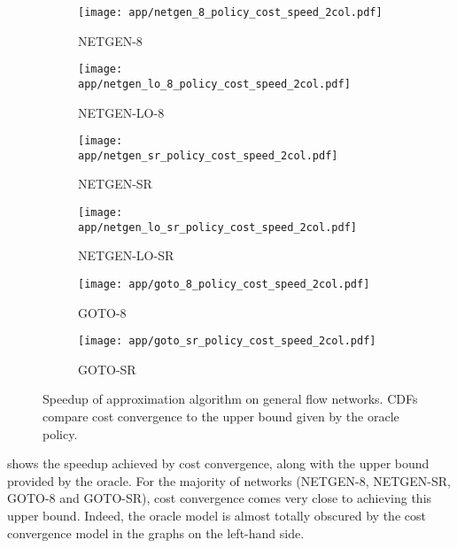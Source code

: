 \begin{figure}
    \begin{widepage}
        \begin{subfigure}[c]{0.5\textwidth}
            \texttt{[image: app/netgen\_8\_policy\_cost\_speed\_2col.pdf]}
            \caption{NETGEN-8}
        \end{subfigure}
        \begin{subfigure}[c]{0.5\textwidth}
            \texttt{[image: app/netgen\_lo\_8\_policy\_cost\_speed\_2col.pdf]}
            \caption{NETGEN-LO-8}
        \end{subfigure}
        \begin{subfigure}[c]{0.5\textwidth}
            \texttt{[image: app/netgen\_sr\_policy\_cost\_speed\_2col.pdf]}
            \caption{NETGEN-SR}
        \end{subfigure}
        \begin{subfigure}[c]{0.5\textwidth}
            \texttt{[image: app/netgen\_lo\_sr\_policy\_cost\_speed\_2col.pdf]}
            \caption{NETGEN-LO-SR}
        \end{subfigure}
        \begin{subfigure}[c]{0.5\textwidth}
            \texttt{[image: app/goto\_8\_policy\_cost\_speed\_2col.pdf]}
            \caption{GOTO-8}
        \end{subfigure}
        \begin{subfigure}[c]{0.5\textwidth}
            \texttt{[image: app/goto\_sr\_policy\_cost\_speed\_2col.pdf]}
            \caption{GOTO-SR}
        \end{subfigure}
    \end{widepage}
    \caption[Speedup of approximation algorithm on general flow networks]{Speedup of approximation algorithm on general flow networks. CDFs compare {\color{matplotlib_blue}cost convergence} to the upper bound given by the {\color{matplotlib_green}oracle policy}.}
    \label{fig:app-general-cost-speed-cdf}
\end{figure}

 shows the speedup achieved by cost convergence, along with the upper bound provided by the oracle. For the majority of networks (NETGEN-8, NETGEN-SR, GOTO-8 and GOTO-SR), cost convergence comes very close to achieving this upper bound. Indeed, the oracle model is almost totally obscured by the cost convergence model in the graphs on the left-hand side.


